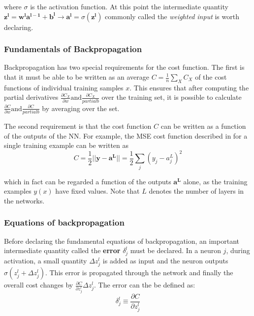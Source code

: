 where $\sigma$ is the activation function. At this point the
intermediate quantity $\bm{z^l} = \bm{w^la^{l-1}} + \bm{b^l}
\rightarrow \bm{a^l} = \sigma(\bm{z^l})$ commonly called the
\textit{weighted input} is worth declaring.

\subsubsection*{Fundamentals of Backpropagation}

Backpropagation has two special requirements for the
cost function. The first is that it must be able to be
written as an average $C = \frac{1}{n} \sum_XC_X$ of the
cost functions of individual training samples $x$. This
ensures that after computing the partial derivatives
$\frac{\partial C_X}{\partial w} \text{and} \frac{\partial C_X}{partial b}$
over the training set, it is possible to calculate 
$\frac{\partial C}{\partial w} \text{and} \frac{\partial C}{partial b}$
by averaging over the set.

The second requirement is that the cost function $C$ can be
written as a function of the outputs of the NN. For example,
the MSE cost function described in 
for a single training example can be written as
\begin{equation}
  \label{eq:backprop_mse}
  C = \frac{1}{2}||\bm{y} - \bm{a^L}|| = \frac{1}{2}\sum_j(y_j - a^L_j)^2
\end{equation}

which in fact can be regarded a function of the outputs $\bm{a^L}$ alone,
as the training examples $y(x)$ have fixed values. Note that $L$ denotes the
number of layers in the networks.

\subsubsection*{Equations of backpropagation}

Before declaring the fundamental equations of backpropagation,
an important intermediate quantity called the \textbf{error} $\delta_j^l$
must be declared. In a neuron $j$, during activation, a small quantity $\Delta z_j^l$
is added as input and the neuron outputs $\sigma (z^l_j + \Delta z_j^l)$.
This error is propagated through the network and finally
the overall cost changes by $\frac{\partial C}{\partial z_j^l}\Delta z_j^l$.
The error can the be defined as:
\begin{equation}
  \label{eq:error_nn}
  \delta_j^l \equiv \frac{\partial C}{\partial z_j^l}
\end{equation}


